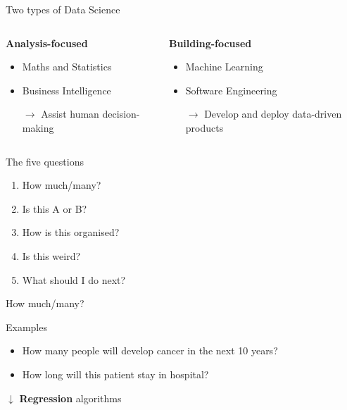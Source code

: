 \begin{frame}{Two types of Data Science}
    \begin{columns}
        \begin{column}{0.5\textwidth}
            \begin{center}
                \large\bf%
                Analysis\hyp{}focused
            \end{center}
            \begin{itemize}
                \item Maths and Statistics
                \item Business Intelligence
                \item[$\to$] Assist human decision\hyp{}making
            \end{itemize}
        \end{column}
        \begin{column}{0.5\textwidth}
            \begin{center}
                \large\bf%
                Building\hyp{}focused
            \end{center}
            \begin{itemize}
                \item Machine Learning
                \item Software Engineering
                \item[$\to$] Develop and deploy data\hyp{}driven products
            \end{itemize}
        \end{column}
    \end{columns}
\end{frame}

\begin{frame}{The five questions}
    \begin{enumerate}
        \item How much/many?
        \item Is this A or B?
        \item How is this organised?
        \item Is this weird?
        \item What should I do next?
    \end{enumerate}
\end{frame}

\begin{frame}{How much/many?}
    \begin{block}{Examples}
        \begin{itemize}
            \item How many people will develop cancer in the next 10 years?
            \item How long will this patient stay in hospital?
        \end{itemize}
    \end{block}
    \begin{center}
        \large%
        $\downarrow$
        \vfill
        \textbf{Regression} algorithms
    \end{center}
\end{frame}

